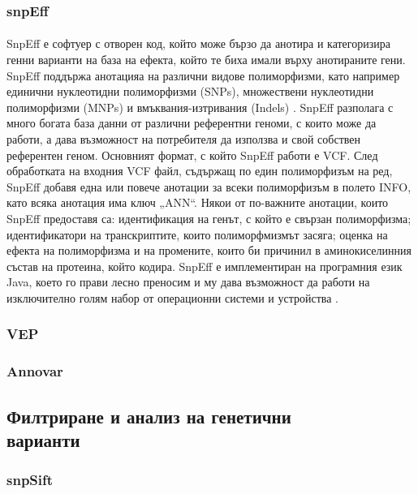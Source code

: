 \documentclass[pdftex,cyrillic,14pt,a4page,twoside]{extreport}
\begin{document}
\subsubsection{snpEff}
\paragraph{}
SnpEff е софтуер с отворен код, който може бързо да анотира и категоризира генни варианти на база на ефекта, който те биха имали върху анотираните гени. SnpEff поддържа анотацияа на различни видове полиморфизми, като например единични нуклеотидни полиморфизми (SNPs), множествени нуклеотидни полиморфизми (MNPs) и вмъквания-изтривания (Indels) \cite{cingolani2012}. SnpEff разполага с много богата база данни от различни референтни геноми, с които може да работи, а дава възможност на потребителя да използва и свой собствен референтен геном. Основният формат, с който SnpEff работи е VCF. След обработката на входния VCF файл, съдържащ по един полиморфизъм на ред, SnpEff добавя една или повече анотации за всеки полиморфизъм в полето INFO, като всяка анотация има ключ „ANN“. Някои от по-важните анотации, които SnpEff предоставя са: идентификация на генът, с който е свързан полиморфизма; идентификатори на транскриптите, които полиморфмизмът засяга; оценка на ефекта на полиморфизма и на промените, които би причинил в аминокиселинния състав на протеина, който кодира. SnpEff е имплементиран на програмния език Java, което го прави лесно преносим и му дава възможност да работи на изключително голям набор от операционни системи и устройства \cite[стр. 9-10]{schildt2020complete}.
\subsubsection{VEP}
\paragraph{}
\subsubsection{Annovar}
\subsection[Филтриране и анализ на генетични варианти]{Филтриране и анализ на генетични\\ варианти}
\subsubsection{snpSift}
\end{document}
